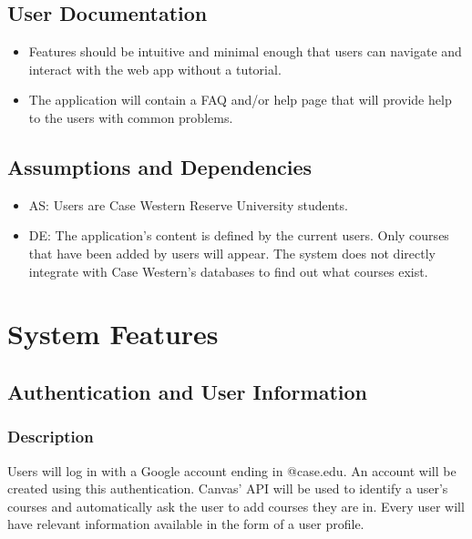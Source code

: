 \documentclass{scrreprt}
\begin{document}
\section{User Documentation}
\begin{itemize}
	\item Features should be intuitive and minimal enough that users can navigate and interact with the web app without a tutorial.
	\item The application will contain a FAQ and/or help page that will provide help to the users with common problems.
\end{itemize}

\section{Assumptions and Dependencies}
\begin{itemize}
	\item AS: Users are Case Western Reserve University students.
	\item DE: The application’s content is defined by the current users. Only courses that have been added by users will appear. The system does not directly integrate with Case Western’s databases to find out what courses exist.
\end{itemize}

\chapter{System Features}

\section{Authentication and User Information}
\subsection{Description}
Users will log in with a Google account ending in @case.edu. An account will be created using this authentication. Canvas’ API will be used to identify a user's courses and automatically ask the user to add courses they are in. Every user will have relevant information available in the form of a user profile.
\end{document}
